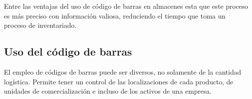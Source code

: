 Entre las ventajas del uso de código de barras en almacenes esta que este proceso es más preciso con información valiosa, reduciendo el tiempo que toma un proceso de inventariado.\\

\subsection{Uso del código de barras}

El empleo de códigos de barras puede ser diversos, no solamente de la cantidad logística. Permite tener un control de las localizaciones de cada producto, de unidades de comercialización e incluso de los activos de una empresa.\\

